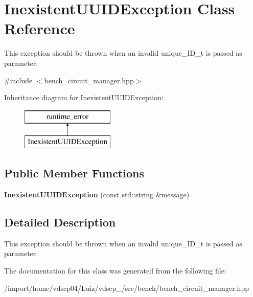 \section{Inexistent\+U\+U\+I\+D\+Exception Class Reference}
\label{classInexistentUUIDException}


This exception should be thrown when an invalid unique\+\_\+\+I\+D\+\_\+t is passed as parameter.  




{\ttfamily \#include $<$bench\+\_\+circuit\+\_\+manager.\+hpp$>$}

Inheritance diagram for Inexistent\+U\+U\+I\+D\+Exception\+:\begin{figure}[H]
\begin{center}
\leavevmode
\includegraphics[height=2.000000cm]{classInexistentUUIDException}
\end{center}
\end{figure}
\subsection*{Public Member Functions}
\begin{DoxyCompactItemize}
\item 
{\bfseries Inexistent\+U\+U\+I\+D\+Exception} (const std\+::string \&message)\label{classInexistentUUIDException_a3a63e43f2b5d726f2cb99a90ff382cbf}

\end{DoxyCompactItemize}


\subsection{Detailed Description}
This exception should be thrown when an invalid unique\+\_\+\+I\+D\+\_\+t is passed as parameter. 

The documentation for this class was generated from the following file\+:\begin{DoxyCompactItemize}
\item 
/import/home/vdscp04/\+Luiz/vdscp\+\_/src/bench/bench\+\_\+circuit\+\_\+manager.\+hpp\end{DoxyCompactItemize}
